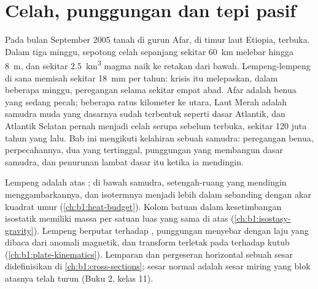 \chapter{Celah, punggungan dan tepi pasif}\label{ch:b1:rifts-ridges-margins}

Pada bulan September 2005 tanah di gurun Afar, di timur laut Etiopia, terbuka. Dalam tiga minggu, sepotong celah sepanjang sekitar \qty{60}{km} melebar hingga \qty{8}{m}, dan sekitar \qty{2.5}{km^3} magma naik ke retakan dari bawah. Lempeng-lempeng di sana memisah sekitar \qty{18}{mm} per tahun: krisis itu melepaskan, dalam beberapa minggu, peregangan selama sekitar empat abad. Afar adalah benua yang sedang pecah; beberapa ratus kilometer ke utara, Laut Merah adalah samudra muda yang dasarnya sudah terbentuk seperti dasar Atlantik, dan Atlantik Selatan pernah menjadi celah serupa sebelum terbuka, sekitar 120 juta tahun yang lalu. Bab ini mengikuti kelahiran sebuah samudra: peregangan benua, perpecahannya, dua  yang tertinggal, punggungan yang membangun dasar samudra, dan penurunan lambat dasar itu ketika ia mendingin.

\begin{recall}
Lempeng adalah  atas ; di bawah samudra, setengah-ruang yang mendingin menggambarkannya, dan isotermnya menjadi lebih dalam sebanding dengan akar kuadrat umur (\cref{ch:b1:heat-budget}). Kolom batuan dalam kesetimbangan isostatik memiliki massa per satuan luas yang sama di atas  (\cref{ch:b1:isostasy-gravity}). Lempeng berputar terhadap , punggungan menyebar dengan laju yang dibaca dari anomali magnetik, dan transform terletak pada  terhadap kutub (\cref{ch:b1:plate-kinematics}). Lemparan dan pergeseran horizontal sebuah sesar didefinisikan di \cref{ch:b1:cross-sections}; sesar normal adalah sesar miring yang blok atasnya telah turun (Buku 2, kelas 11).
\end{recall}


